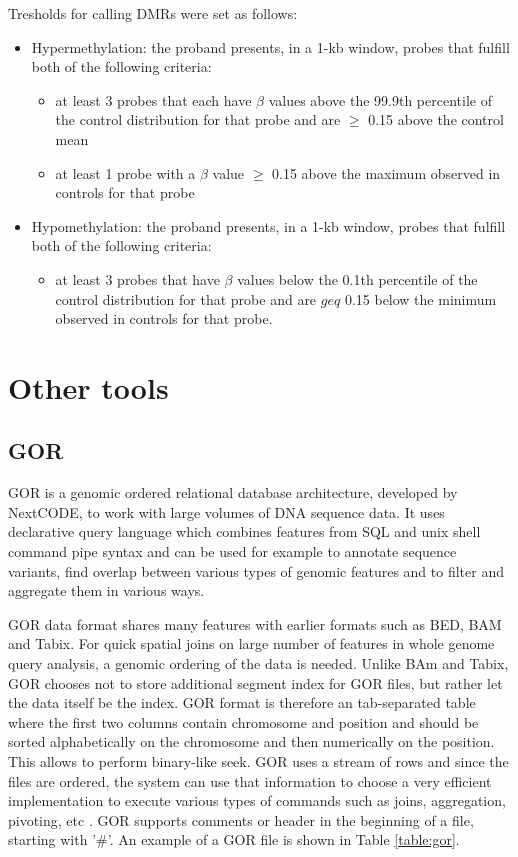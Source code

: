Tresholds for calling DMRs were set as follows:
\begin{itemize}
    \item Hypermethylation: the proband presents, in a 1-kb window, probes that fulfill both of the following criteria:
    \begin{itemize}
        \item at least 3 probes that each have $\beta$ values above the 99.9th percentile of the control distribution for that probe and are $\geq$ 0.15 above the control mean
        \item at least 1 probe with a $\beta$ value $\geq$ 0.15 above the maximum observed in controls for that probe
    \end{itemize}
    \item Hypomethylation: the proband presents, in a 1-kb window, probes that fulfill both of the following criteria:
    \begin{itemize}
        \item at least 3 probes that have $\beta$ values below the 0.1th percentile of the control distribution for that probe and are $geq$ 0.15 below the minimum observed in controls for that probe.
    \end{itemize}
\end{itemize}


\section{Other tools}
\label{sec:background:Other-tools}

\subsection{GOR}
GOR is a genomic ordered relational database architecture, developed by NextCODE, to work with large volumes of DNA sequence data. It uses declarative query language which combines features from SQL and unix shell command pipe syntax and can be used for example to annotate sequence variants, find overlap between various types of genomic features and to filter and aggregate them in various ways.

GOR data format shares many features with earlier formats such as BED, BAM and Tabix. For quick spatial joins on large number of features in whole genome query analysis, a genomic ordering of the data is needed. Unlike BAm and Tabix, GOR chooses not to store additional segment index for GOR files, but rather let the data itself be the index. GOR format is therefore an tab-separated table where the first two columns contain chromosome and position and should be sorted alphabetically on the chromosome and then numerically on the position. This allows to perform binary-like seek. GOR uses a stream of rows and since the files are ordered, the system can use that information to choose a very efficient implementation to execute various types of commands such as joins, aggregation, pivoting, etc \cite{gudhbjartsson2016gorpipe}. GOR supports comments or header in the beginning of a file, starting with '\#'. An example of a GOR file is shown in Table \ref{table:gor}.

